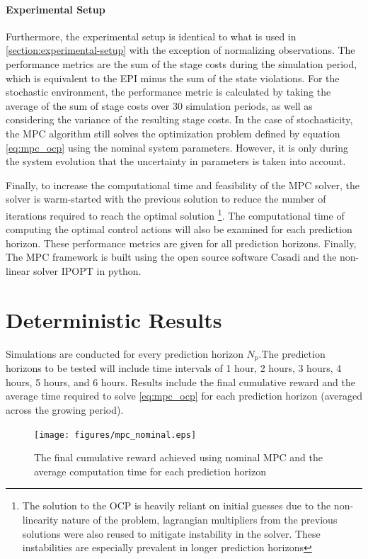 \paragraph{Experimental Setup} Furthermore, the experimental setup is identical to what is used in \autoref{section:experimental-setup} with the exception of normalizing observations. The performance metrics are the sum of the stage costs during the simulation period, which is equivalent to the EPI minus the sum of the state violations. For the stochastic environment, the performance metric is calculated by taking the average of the sum of stage costs over 30 simulation periods, as well as considering the variance of the resulting stage costs. In the case of stochasticity, the MPC algorithm still solves the optimization problem defined by equation \autoref{eq:mpc_ocp} using the nominal system parameters. However, it is only during the system evolution that the uncertainty in parameters is taken into account. 

Finally, to increase the computational time and feasibility of the MPC solver, the solver is warm-started with the previous solution to reduce the number of iterations required to reach the optimal solution  \footnote{The solution to the OCP is heavily reliant on initial guesses due to the non-linearity nature of the problem, lagrangian multipliers from the previous solutions were also reused to mitigate instability in the solver. These instabilities are especially prevalent in longer prediction horizons}. The computational time of computing the optimal control actions will also be examined for each prediction horizon. These performance metrics are given for all prediction horizons. Finally, The MPC framework is built using the open source software Casadi \cite{Andersson2018} and the non-linear solver IPOPT \cite{wachterImplementationInteriorpointFilter2006} in python. 

\section{Deterministic Results}
Simulations are conducted for every prediction horizon $N_p$.The prediction horizons to be tested will include time intervals of 1 hour, 2 hours, 3 hours, 4 hours, 5 hours, and 6 hours. Results include the final cumulative reward and the average time required to solve \autoref{eq:mpc_ocp} for each prediction horizon (averaged across the growing period).

\begin{figure}[H]
	\centering
	\texttt{[image: figures/mpc\_nominal.eps]}
	\caption{The final cumulative reward achieved using nominal MPC and the average computation time for each prediction horizon}
	\label{fig:nominal_mpc_perf}
\end{figure}

